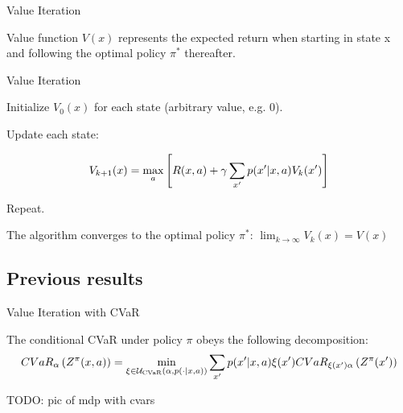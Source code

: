 \documentclass{beamer}
\begin{document}
\begin{frame}{Value Iteration}

\begin{definition}

Value function $V(x)$ represents the expected return when starting in state x and following the optimal policy $\pi^*$ thereafter.

\end{definition}

\begin{block}{Value Iteration}

Initialize $V_0(x)$ for each state (arbitrary value, e.g. 0).

Update each state:

$$V_{k+1}(x) = \max_a \left[ {R(x, a) + \gamma\sum_{x'}  p(x'|x, a) V_k(x')} \right]$$

Repeat.
\end{block}

The algorithm converges to the optimal policy $\pi^*$: $\lim_{k\to\infty}V_k(x) = V(x)$

\end{frame}


\subsection{Previous results}

\begin{frame}{Value Iteration with CVaR}

\begin{theorem}
The conditional CVaR under policy $\pi$ obeys the following decomposition:
$$CVaR_\alpha\left( {Z^\pi(x, a)} \right) = \min_{\xi \in \mathcal{U}_{\text{CVaR}}(\alpha, p(\cdot | x, a))} \sum_{x'} p(x'| x, a)\xi(x') CVaR_{\xi(x')\alpha}\left( {Z^\pi(x')} \right)$$
\end{theorem}

TODO: pic of mdp with cvars

\end{frame}

\end{document}

